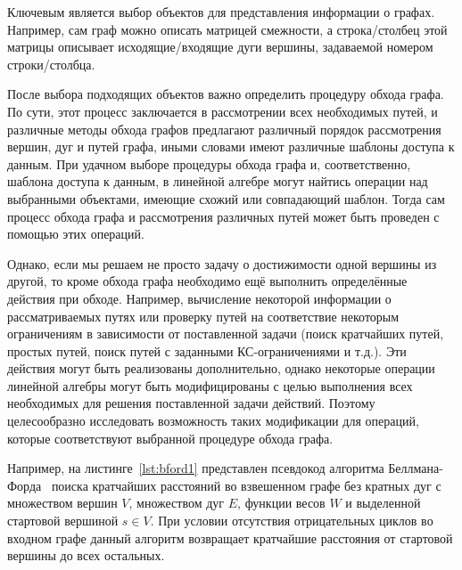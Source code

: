 Ключевым является выбор объектов для представления информации о графах. Например, сам граф можно описать матрицей смежности, а строка/столбец этой матрицы описывает  исходящие/входящие дуги вершины, задаваемой номером строки/столбца. 

После выбора подходящих объектов важно определить процедуру обхода графа. По сути, этот процесс заключается в рассмотрении всех необходимых путей, и различные методы обхода графов предлагают различный порядок рассмотрения вершин, дуг и путей графа, иными словами имеют различные шаблоны доступа к данным. При удачном выборе процедуры обхода графа и, соответственно, шаблона доступа к данным, в линейной алгебре могут найтись операции над выбранными объектами, имеющие схожий или совпадающий шаблон. Тогда сам процесс обхода графа и рассмотрения различных путей может быть проведен с помощью этих операций.

Однако, если мы решаем не просто задачу о достижимости одной вершины из другой, то кроме обхода графа необходимо ещё выполнить определённые действия при обходе. Например, вычисление некоторой информации о рассматриваемых путях или проверку путей на соответствие некоторым ограничениям в зависимости от поставленной задачи (поиск кратчайших путей, простых путей, поиск путей с заданными КС-ограничениями и т.д.). Эти действия могут быть реализованы дополнительно, однако некоторые операции линейной алгебры могут быть модифицированы с целью выполнения всех необходимых для решения поставленной задачи действий. Поэтому целесообразно исследовать возможность таких модификации для операций, которые соответствуют выбранной процедуре обхода графа.

Например, на листинге~\ref{lst:bford1} представлен псевдокод алгоритма Беллмана-Форда~\cite{bellman1958routing,ford2015flows} поиска кратчайших расстояний во взвешенном графе без кратных дуг с множеством вершин $V$, множеством дуг $E$, функции весов $W$ и выделенной стартовой вершиной $s \in V$. При условии отсутствия отрицательных циклов во входном графе данный алгоритм возвращает кратчайшие расстояния от стартовой вершины до всех остальных.

